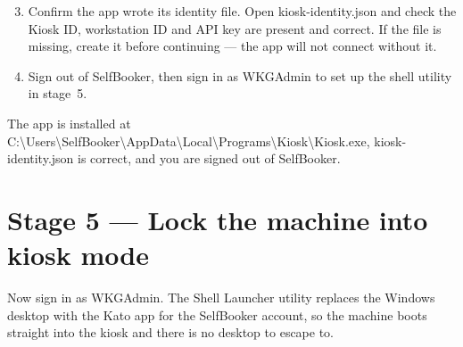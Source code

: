 \documentclass[a4paper,10pt]{article}
\newcommand{\wpath}[1]{{\ttfamily\small #1}}
\begin{document}
\begin{enumerate}\setcounter{enumi}{2}
  \item Confirm the app wrote its identity file. Open
        \wpath{kiosk-identity.json} and check the Kiosk ID, workstation
        ID and API key are present and correct. If the file is missing,
        create it before continuing --- the app will not connect
        without it.

  \item Sign out of \wpath{SelfBooker}, then sign in as \wpath{WKGAdmin}
        to set up the shell utility in stage~5.
\end{enumerate}

\begin{wkinfo}
The app is installed at
\wpath{C:\textbackslash Users\textbackslash SelfBooker\textbackslash AppData\textbackslash Local\textbackslash Programs\textbackslash Kiosk\textbackslash Kiosk.exe},
\wpath{kiosk-identity.json} is correct, and you are signed out of
\wpath{SelfBooker}.
\end{wkinfo}

\clearpage
\section{Stage 5 --- Lock the machine into kiosk mode}

Now sign in as \wpath{WKGAdmin}. The Shell Launcher utility replaces the
Windows desktop with the Kato app for the \wpath{SelfBooker} account, so
the machine boots straight into the kiosk and there is no desktop to
escape to.
\end{document}
